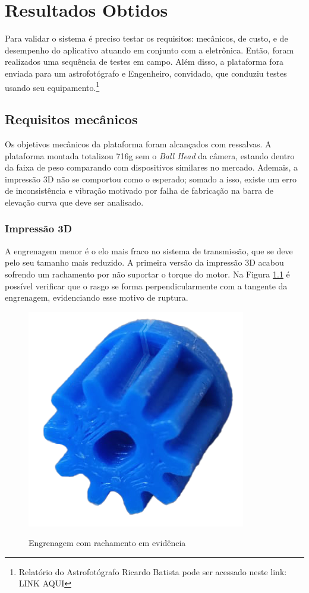 \chapter{Resultados Obtidos}

Para validar o sistema é preciso testar os requisitos: mecânicos, de custo, e de desempenho do aplicativo atuando em conjunto com a eletrônica. Então, foram realizados uma sequência de testes em campo. Além disso, a plataforma fora enviada para um astrofotógrafo e Engenheiro, convidado, que conduziu testes usando seu equipamento.\footnote{Relatório do Astrofotógrafo Ricardo Batista pode ser acessado neste link: LINK AQUI}

\section{Requisitos mecânicos}

Os objetivos mecânicos da plataforma foram alcançados com ressalvas. A plataforma montada totalizou 716g sem o \textit{Ball Head} da câmera, estando dentro da faixa de peso comparando com dispositivos similares no mercado. Ademais, a impressão 3D não se comportou como o esperado; somado a isso, existe um erro de inconsistência e vibração motivado por falha de fabricação na barra de elevação curva que deve ser analisado.


\subsection{Impressão 3D}
A engrenagem menor é o elo mais fraco no sistema de transmissão, que se deve pelo seu tamanho mais reduzido. A primeira versão da impressão 3D acabou sofrendo um rachamento por não suportar o torque do motor. Na Figura \ref{fig:engrenagem} é possível verificar que o rasgo se forma perpendicularmente com a tangente da engrenagem, evidenciando esse motivo de ruptura.

\begin{figure}[htb]
	\centering
	\caption{Engrenagem com rachamento em evidência}
	\includegraphics[width=0.25\linewidth]{figuras/resultados/engrenagem}
	\label{fig:engrenagem}
\end{figure}

